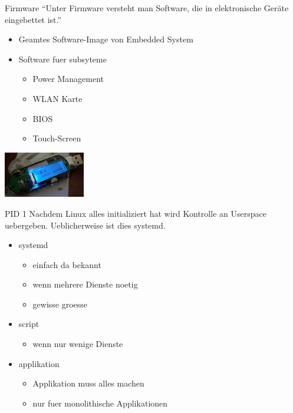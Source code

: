 \begin{frame}{Firmware}
	``Unter Firmware versteht man Software, die in elektronische Geräte eingebettet ist.'' \cite{wikiFirmware}
	
	\begin{itemize}
		\item Geamtes Software-Image von Embedded System
		\item Software fuer subsyteme
		\begin{itemize}
			\item Power Management
			\item WLAN Karte
			\item BIOS
			\item Touch-Screen
		\end{itemize}
	\end{itemize}
	
	\includegraphics[height=2cm]{res/Firmware_upgrade.jpg} \cite{firmwareUpgrade}
\end{frame}

\begin{frame}{PID 1}
	Nachdem Linux alles initializiert hat wird Kontrolle an Userspace uebergeben.
	Ueblicherweise ist dies systemd.
	\begin{itemize}
		\item systemd
		\begin{itemize}
			\item einfach da bekannt
			\item wenn mehrere Dienste noetig
			\item gewisse groesse
		\end{itemize}
		\item script
		\begin{itemize}
			\item wenn nur wenige Dienste
		\end{itemize}
		\item applikation
		\begin{itemize}
			\item Applikation muss alles machen
			\item nur fuer monolithische Applikationen
		\end{itemize}
	\end{itemize}
\end{frame}

